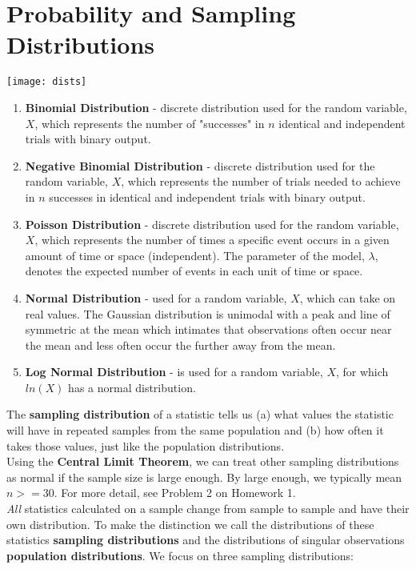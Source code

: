 \documentclass{article}
\begin{document}
\section{Probability and Sampling Distributions}
  \begin{center}
    \texttt{[image: dists]}
  \end{center}
  \begin{enumerate}
    \item \textbf{Binomial Distribution} - discrete distribution used for
the random variable, $X$, which represents the number of
"successes" in $n$ identical and independent trials with binary
output.
    \item \textbf{Negative Binomial Distribution} -  discrete distribution
used for the random variable, $X$, which represents the number
of trials needed to achieve in $n$ successes in identical and
independent trials with binary output.
    \item \textbf{Poisson Distribution} - discrete distribution used for the random variable, $X$, which represents the number of times a
specific event occurs in a given amount of time or space
(independent). The parameter of the model, $\lambda$, denotes the
expected number of events in each unit of time or space.
    \item \textbf{Normal Distribution} -  used for a random variable, $X$, which can take on real values. The Gaussian distribution is unimodal with a peak and line of symmetric at the mean which intimates that observations often occur near the mean and less often occur the further away from the mean.
    \item \textbf{Log Normal Distribution} - is used for a random variable, $X$, for which $ln(X)$ has a normal distribution.
  \end{enumerate}
  The \textbf{sampling distribution} of a statistic tells us (a) what values the statistic will have in repeated samples from the same
population and (b) how often it takes those values, just like the
population distributions. \\
  Using the \textbf{Central Limit Theorem}, we can treat other sampling distributions as normal if the sample size is large enough. By large enough, we typically mean $n>=30$. For more detail, see Problem 2 on Homework 1.
  \\ \emph{All} statistics calculated on a sample change from sample to sample and have their own distribution. To make the distinction we call the distributions of these statistics \textbf{sampling distributions} and the distributions of singular observations \textbf{population distributions}. We focus on three sampling distributions:
\end{document}
